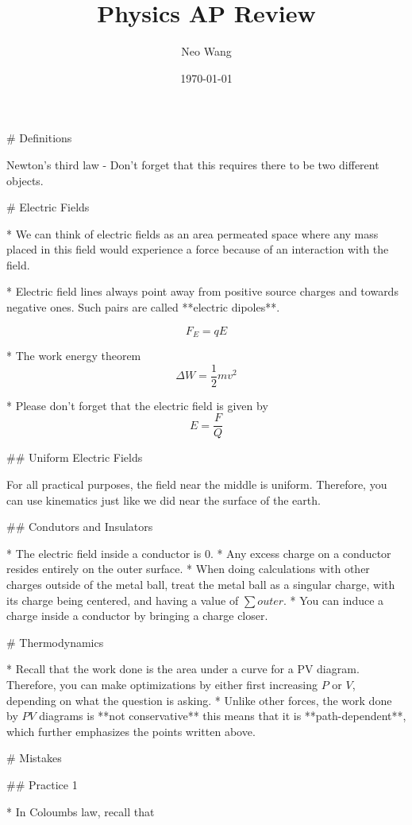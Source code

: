 \documentclass{article}
\title{Physics AP Review}
\author{Neo Wang}
\date{\today}
\begin{document}
\maketitle
\tableofcontents

\begin{markdown}

# Definitions

Newton's third law - Don't forget that this requires there to be two different objects.

# Electric Fields

* We can think of electric fields as an area permeated space where any mass placed in this field would experience a force because of an interaction with the field.

* Electric field lines always point away from positive source charges and towards negative ones. Such pairs are called **electric dipoles**.

$$
F_E = qE
$$

* The work energy theorem $$\Delta W = \frac{1}{2}mv^2$$

* Please don't forget that the electric field is given by $$E = \frac{F}{Q}$$

## Uniform Electric Fields

For all practical purposes, the field near the middle is uniform. Therefore, you can use kinematics just like we did near the surface of the earth.

## Condutors and Insulators

* The electric field inside a conductor is $0$.
* Any excess charge on a conductor resides entirely on the outer surface.
* When doing calculations with other charges outside of the metal ball, treat the metal ball as a singular charge, with its charge being centered, and having a value of $\sum outer$.
* You can induce a charge inside a conductor by bringing a charge closer. 

# Thermodynamics

* Recall that the work done is the area under a curve for a PV diagram. Therefore, you can make optimizations by either first increasing $P$ or $V$, depending on what the question is asking.
* Unlike other forces, the work done by $PV$ diagrams is **not conservative** this means that it is **path-dependent**, which further emphasizes the points written above.

# Mistakes

## Practice 1

* In Coloumbs law, recall that

\end{markdown}
\end{document}
